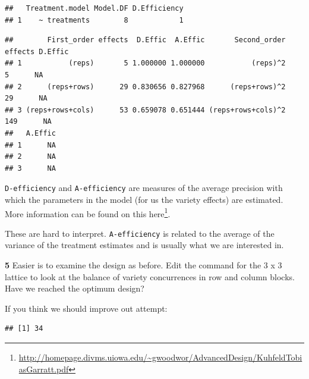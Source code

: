 \documentclass[
]{book}
\makeatletter
\newenvironment{Shaded}{\begin{snugshade}}{\end{snugshade}}
\newcommand{\FloatTok}[1]{\textcolor[rgb]{0.00,0.00,0.81}{#1}}
\newcommand{\NormalTok}[1]{#1}
\newcommand{\SpecialCharTok}[1]{\textcolor[rgb]{0.00,0.00,0.00}{#1}}
\renewcommand{\href}[2]{#2\footnote{\url{#1}}}
\newenvironment{kframe}{%
\medskip{}
\setlength{\fboxsep}{.8em}
 \def\at@end@of@kframe{}%
 \ifinner\ifhmode%
  \def\at@end@of@kframe{\end{minipage}}%
  \begin{minipage}{\columnwidth}%
 \fi\fi%
 \def\FrameCommand##1{\hskip\@totalleftmargin \hskip-\fboxsep
 \colorbox{shadecolor}{##1}\hskip-\fboxsep
     \hskip-\linewidth \hskip-\@totalleftmargin \hskip\columnwidth}%
 \MakeFramed {\advance\hsize-\width
   \@totalleftmargin\z@ \linewidth\hsize
   \@setminipage}}%
 {\par\unskip\endMakeFramed%
 \at@end@of@kframe}
\newenvironment{rmdblock}[1]
  {
  \begin{itemize}
  \renewcommand{\labelitemi}{
    \raisebox{-.7\height}[0pt][0pt]{
      {\setkeys{Gin}{width=3em,keepaspectratio}\texttt{[image: images/\#1]}}
    }
  }
  \setlength{\fboxsep}{1em}
  \begin{kframe}
  \item
  }
  {
  \end{kframe}
  \end{itemize}
  }
\newenvironment{rmdquiz}
  {\begin{rmdblock}{quiz}}
  {\end{rmdblock}}
\makeatother
\begin{document}
\begin{verbatim}
##   Treatment.model Model.DF D.Efficiency
## 1    ~ treatments        8            1
\end{verbatim}

\begin{Shaded}
\end{Shaded}

\begin{verbatim}
##        First_order effects  D.Effic  A.Effic       Second_order effects D.Effic
## 1           (reps)       5 1.000000 1.000000           (reps)^2       5      NA
## 2      (reps+rows)      29 0.830656 0.827968      (reps+rows)^2      29      NA
## 3 (reps+rows+cols)      53 0.659078 0.651444 (reps+rows+cols)^2     149      NA
##   A.Effic
## 1      NA
## 2      NA
## 3      NA
\end{verbatim}

\texttt{D-efficiency} and \texttt{A-efficiency} are measures of the average precision with which the parameters in the model (for us the variety effects) are estimated. More information can be found on this \href{http://homepage.divms.uiowa.edu/~gwoodwor/AdvancedDesign/KuhfeldTobiasGarratt.pdf}{here}.

These are hard to interpret. \texttt{A-efficiency} is related to the average of the variance of the treatment estimates and is usually what we are interested in.

\begin{rmdquiz}
\textbf{5} Easier is to examine the design as before. Edit the command for the 3 x 3 lattice to look at the balance of variety concurrences in row and column blocks. Have we reached the optimum design?
\end{rmdquiz}

If you think we should improve out attempt:

\begin{Shaded}
\end{Shaded}

\begin{verbatim}
## [1] 34
\end{verbatim}
\end{document}
